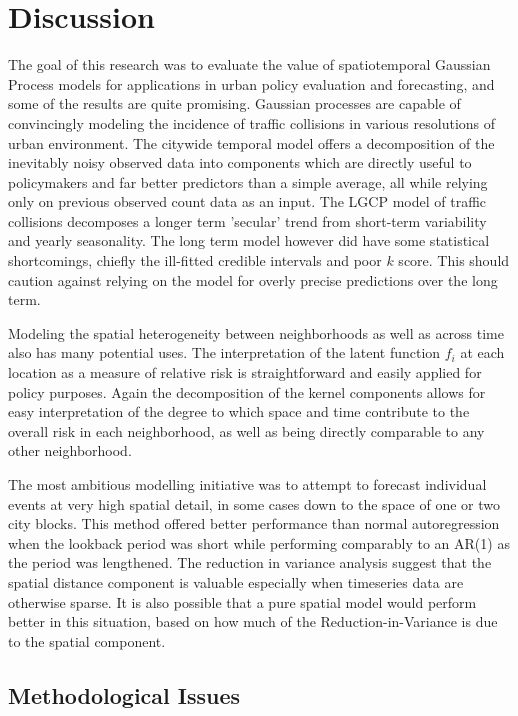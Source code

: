 \chapter{Discussion}
\label{discussion}

The goal of this research was to evaluate the value of spatiotemporal Gaussian Process models for applications in urban policy evaluation and forecasting, and some of the results are quite promising. Gaussian processes are capable of convincingly modeling the incidence of traffic collisions in various resolutions of urban environment. The citywide temporal model offers a decomposition of the inevitably noisy observed data into components which are directly useful to policymakers and far better predictors than a simple average, all while relying only on previous observed count data as an input. The LGCP model of traffic collisions decomposes a longer term 'secular' trend from short-term variability and yearly seasonality. The long term model however did have some statistical shortcomings, chiefly the ill-fitted credible intervals and poor $k$ score. This should caution against relying on the model for overly precise predictions over the long term. \par

Modeling the spatial heterogeneity between neighborhoods as well as across time also has many potential uses. The interpretation of the latent function $f_i$ at each location as a measure of relative risk is straightforward and easily applied for policy purposes. Again the decomposition of the kernel components allows for easy interpretation of the degree to which space and time contribute to the overall risk in each neighborhood, as well as being directly comparable to any other neighborhood. \par

The most ambitious modelling initiative was to attempt to forecast individual events at very high spatial detail, in some cases down to the space of one or two city blocks. This method offered better performance than normal autoregression when the lookback period was short while performing comparably to an AR(1) as the period was lengthened. The reduction in variance analysis suggest that the spatial distance component is valuable especially when timeseries data are otherwise sparse. It is also possible that a pure spatial model would perform better in this situation, based on how much of the Reduction-in-Variance is due to the spatial component.

\section{Methodological Issues}

